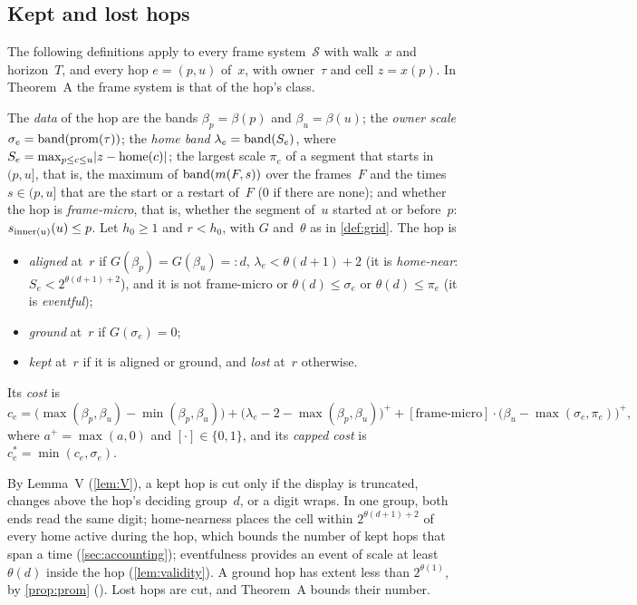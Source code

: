 \subsection{Kept and lost hops}\label{sec:ladders-kept}

The following definitions apply to every frame system~$\mathcal S$ with walk~$x$ and horizon~$T$, and every hop $e=(p,u)$
of~$x$, with owner~$\tau$ and cell $z=x(p)$. In Theorem~A the frame system is that of the hop's class.

\begin{definition}\label{def:kept}
The \emph{data} of the hop are the bands $\beta_p=\beta(p)$ and $\beta_u=\beta(u)$; the \emph{owner scale}
$\sigma_e=\operatorname{band}(\operatorname{prom}(\tau))$; the \emph{home band} $\lambda_e=\operatorname{band}(S_e)$, where $S_e=\max_{p\le c\le u}\lvert z-\operatorname{home}(c) \rvert$; the
largest scale $\pi_e$ of a segment that starts in $(p,u]$, that is, the maximum of $\operatorname{band}(m(F,s))$ over the frames~$F$ and the
times $s\in(p,u]$ that are the start or a restart of~$F$ ($0$ if there are none); and whether the hop is \emph{frame-micro}, that
is, whether the segment of~$u$ started at or before~$p$: $s_{\operatorname{inner}(u)}(u)\le p$. Let $h_0\ge1$ and $r<h_0$, with $G$
and~$\theta$ as in \cref{def:grid}. The hop is
\begin{itemize}[leftmargin=1.5em]
\item \emph{aligned} at~$r$ if $G(\beta_p)=G(\beta_u)=:d$, $\lambda_e<\theta(d+1)+2$ (it is \emph{home-near}:
$S_e<2^{\theta(d+1)+2}$), and it is not frame-micro or $\theta(d)\le\sigma_e$ or $\theta(d)\le\pi_e$ (it is \emph{eventful});
\item \emph{ground} at~$r$ if $G(\sigma_e)=0$;
\item \emph{kept} at~$r$ if it is aligned or ground, and \emph{lost} at~$r$ otherwise.
\end{itemize}
Its \emph{cost} is
\[
  c_e=\bigl(\max(\beta_p,\beta_u)-\min(\beta_p,\beta_u)\bigr)+\bigl(\lambda_e-2-\max(\beta_p,\beta_u)\bigr)^+
  +[\text{frame-micro}]\cdot\bigl(\beta_u-\max(\sigma_e,\pi_e)\bigr)^+,
\]
where $a^+=\max(a,0)$ and $[\cdot]\in\{0,1\}$, and its \emph{capped cost} is $c^*_e=\min(c_e,\sigma_e)$.
\end{definition}

By Lemma~V (\cref{lem:V}), a kept hop is cut only if the display is truncated, changes above the hop's deciding group~$d$,
or a digit wraps. In one group, both ends read the same digit; home-nearness places the cell within $2^{\theta(d+1)+2}$ of every
home active during the hop, which bounds the number of kept hops that span a time (\cref{sec:accounting}); eventfulness provides
an event of scale at least $\theta(d)$ inside the hop (\cref{lem:validity}). A ground hop has extent less than $2^{\theta(1)}$, by
\cref{prop:prom} (). Lost hops are cut, and Theorem~A bounds their number.

